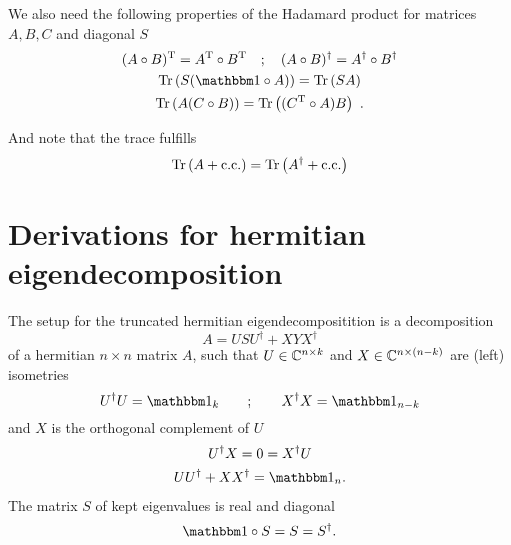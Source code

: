 We also need the following properties of the Hadamard product for matrices $A, B, C$ and diagonal $S$
\begin{gather}
    (A\hadamard B)^\transpT = A^\transpT \hadamard B^\transpT
    \quad ; \quad
    (A\hadamard B)^\dagger = A^\dagger \hadamard B^\dagger
    \label{eq:autodiff_derivations:hadamard_transp_dagg}
    \\
    \tr{S(\eye\hadamard A)} = \tr{SA}
    \label{eq:autodiff_derivations:hadamard_trace_diag}
    \\
    \tr{A(C\hadamard B)} = \tr{(C^\transpT \hadamard A) B}
    ~.
    \label{eq:autodiff_derivations:hadamard_trace_ACB}
\end{gather}

And note that the trace fulfills
\begin{equation}
    \label{eq:autodiff_derivations:trace_pcc_dagger_invariance}
    \mathrm{Tr}\left( {A + \mathrm{c.c.}} \right) = \mathrm{Tr}\left( {A^\dagger + \mathrm{c.c.}} \right)
\end{equation}

\section{Derivations for hermitian eigendecomposition}

The setup for the truncated hermitian eigendecompositition is a decomposition
\begin{equation}
    \label{eq:autodiff_derivations:eigh:a}
    A = U S U^\dagger + X Y X^\dagger
\end{equation}
of a hermitian $n \times n$ matrix $A$, such that $U \in \mathbb{C}^{n \times k}$ and $X\in\mathbb{C}^{n \times (n - k)}$ are (left) isometries
\begin{equation}
    \label{eq:autodiff_derivations:eigh:b}
    U^\dagger U = \eye_{k}
    \qquad ; \qquad
    X^\dagger X = \eye_{n-k}
\end{equation}
and $X$ is the orthogonal complement of $U$
\begin{gather}
    \label{eq:autodiff_derivations:eigh:c}
    U^\dagger X = 0 = X^\dagger U
    \\
    \label{eq:autodiff_derivations:eigh:d}
    U U^\dagger + X X^\dagger = \eye_n
    .
\end{gather}
%
The matrix $S$ of kept eigenvalues is real and diagonal
\begin{equation}
    \label{eq:autodiff_derivations:eigh:e}
    \eye \hadamard S = S = S^\dagger
    .
\end{equation}

